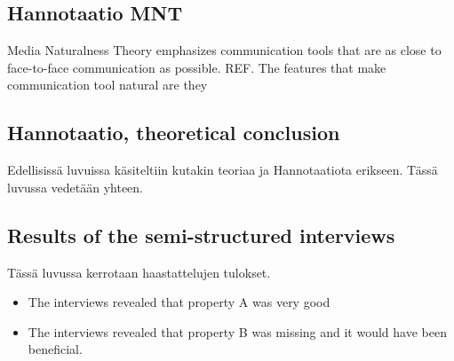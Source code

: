 \documentclass[english,12pt,a4paper,pdftex]{article}
\begin{document}
\subsection{Hannotaatio MNT}

Media Naturalness Theory emphasizes communication tools that are as close to face-to-face communication as possible. REF. The features that make communication tool natural are they

\subsection{Hannotaatio, theoretical conclusion}

Edellisissä luvuissa käsiteltiin kutakin teoriaa ja Hannotaatiota erikseen. Tässä luvussa vedetään yhteen.

\subsection{Results of the semi-structured interviews}

Tässä luvussa kerrotaan haastattelujen tulokset.

\begin{itemize}
\item The interviews revealed that property A was very good
\item The interviews revealed that property B was missing and it would have been beneficial.
\end{itemize}

\end{document}
